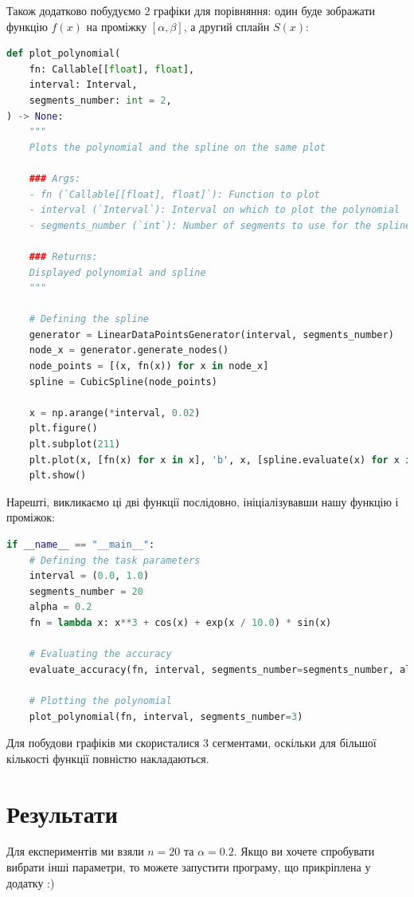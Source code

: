 \documentclass[12pt]{extarticle}
\begin{document}
Також додатково побудуємо 2 графіки для порівняння: один буде зображати функцію $f(x)$ на проміжку $[\alpha,\beta]$, а другий сплайн $S(x)$:
\begin{lstlisting}[language=Python, caption=Побудова графіків]
def plot_polynomial(
    fn: Callable[[float], float],
    interval: Interval,
    segments_number: int = 2,
) -> None:
    """
    Plots the polynomial and the spline on the same plot
    
    ### Args:
    - fn (`Callable[[float], float]`): Function to plot
    - interval (`Interval`): Interval on which to plot the polynomial
    - segments_number (`int`): Number of segments to use for the spline
    
    ### Returns:
    Displayed polynomial and spline
    """
    
    # Defining the spline
    generator = LinearDataPointsGenerator(interval, segments_number)
    node_x = generator.generate_nodes()
    node_points = [(x, fn(x)) for x in node_x]
    spline = CubicSpline(node_points)
    
    x = np.arange(*interval, 0.02)
    plt.figure()
    plt.subplot(211)
    plt.plot(x, [fn(x) for x in x], 'b', x, [spline.evaluate(x) for x in x], 'r--')
    plt.show()
\end{lstlisting}

Нарешті, викликаємо ці дві функції послідовно, ініціалізувавши нашу функцію і проміжок:
\begin{lstlisting}[language=Python, caption=Вхід на програму]
if __name__ == "__main__":
    # Defining the task parameters
    interval = (0.0, 1.0)
    segments_number = 20
    alpha = 0.2
    fn = lambda x: x**3 + cos(x) + exp(x / 10.0) * sin(x)
    
    # Evaluating the accuracy
    evaluate_accuracy(fn, interval, segments_number=segments_number, alpha=alpha)
    
    # Plotting the polynomial
    plot_polynomial(fn, interval, segments_number=3)
\end{lstlisting}

Для побудови графіків ми скористалися $3$ сегментами, оскільки для більшої кількості функції повністю накладаються.

\pagebreak

\section{Результати}

Для експериментів ми взяли $n=20$ та $\alpha=0.2$. Якщо ви хочете спробувати вибрати інші параметри, то можете запустити програму, що прикріплена у додатку :)
\end{document}
